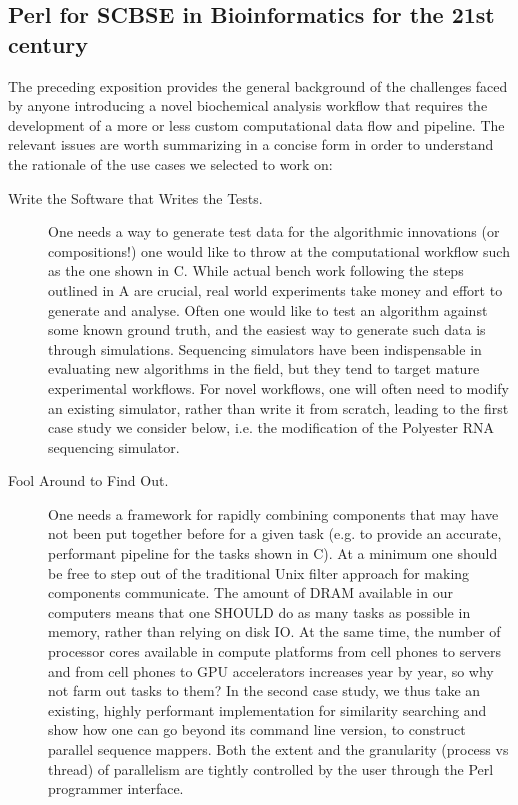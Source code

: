 \documentclass[10pt]{article}
\begin{document}
\subsection{Perl for SCBSE in Bioinformatics for the 21st century}\label{sec:PerlIn21stCenturySequencing}
The preceding exposition provides the general background of the challenges faced by anyone introducing a novel biochemical analysis workflow that requires the development of a more or less custom computational data flow and pipeline. The relevant issues are worth summarizing in a concise form in order to understand the rationale of the use cases we selected to work on:
\begin{description}
\item [Write the Software that Writes the Tests.] One needs a way to generate test data for the algorithmic innovations (or compositions!) one would like to throw at the computational workflow such as the one shown in C. While actual bench work following the steps outlined in A are crucial, real world experiments take money and effort to generate and analyse. Often one would like to test an algorithm against some known ground truth, and the easiest way to generate such data is through simulations. Sequencing simulators have been indispensable in evaluating new algorithms in the field, but they tend to target mature experimental workflows. For novel workflows, one will often need to modify an existing simulator, rather than write it from scratch, leading to the first case study we consider below, i.e. the modification of the Polyester RNA sequencing simulator.
\item [Fool Around to Find Out.] One needs a framework for rapidly combining components that may have not been put together before for a given task (e.g. to provide an accurate, performant pipeline for the tasks shown in C). At a minimum one should be free to step out of the traditional Unix filter approach for making components communicate. The amount of DRAM available in our computers means that one SHOULD do as many tasks as possible in memory, rather than relying on disk IO. At the same time, the number of processor cores available in compute platforms from cell phones to servers and from cell phones to GPU accelerators increases year by year, so why not farm out tasks to them? In the second case study, we thus take an existing, highly performant implementation for similarity searching and show how one can go beyond its command line version, to construct parallel sequence mappers. Both the extent and the granularity (process vs thread) of parallelism are tightly controlled by the user through the Perl programmer interface. 

\end{description}
\end{document}
